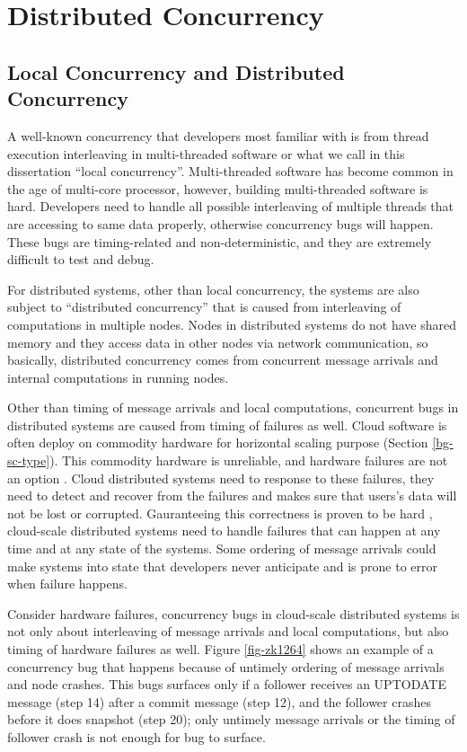 \section{Distributed Concurrency}
\label{bg-dc}

\subsection{Local Concurrency and Distributed Concurrency}



A well-known concurrency that developers most familiar with is from thread
execution interleaving in multi-threaded software or what we call in this
dissertation ``local concurrency''. Multi-threaded software has become common in
the age of multi-core processor, however, building multi-threaded software is
hard. Developers need to handle all possible interleaving of multiple threads
that are accessing to same data properly, otherwise concurrency bugs will
happen. These bugs are timing-related and non-deterministic, and they are
extremely difficult to test and debug.

For distributed systems, other than local concurrency, the systems are also
subject to ``distributed concurrency'' that is caused from interleaving of
computations in multiple nodes. Nodes in distributed systems do not have shared
memory and they access data in other nodes via network communication, so
basically, distributed concurrency comes from concurrent message arrivals and
internal computations in running nodes.

Other than timing of message arrivals and local computations, concurrent bugs in
distributed systems are caused from timing of failures as well. Cloud software
is often deploy on commodity hardware for horizontal scaling purpose (Section
\ref{bg-sc-type}). This commodity hardware is unreliable, and hardware failures
are not an option . Cloud distributed systems need to
response to these failures, they need to detect and recover from the failures
and makes sure that users's data will not be lost or corrupted. Gauranteeing
this correctness is proven to be hard ,
cloud-scale distributed systems need to handle failures that can happen at any
time and at any state of the systems. Some ordering of message arrivals could
make systems into state that developers never anticipate and is prone to error
when failure happens.

Consider hardware failures, concurrency bugs in cloud-scale distributed systems
is not only about interleaving of message arrivals and local computations, but
also timing of hardware failures as well. Figure \ref{fig-zk1264} shows an
example of a concurrency bug that happens because of untimely ordering of
message arrivals and node crashes. This bugs surfaces only if a follower
receives an UPTODATE message (step 14) after a commit message (step 12), and the
follower crashes before it does snapshot (step 20); only untimely message
arrivals or the timing of follower crash is not enough for bug to surface.

